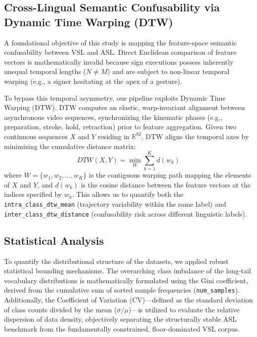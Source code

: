 \documentclass{ieeeaccess}
\begin{document}
\subsection{Cross-Lingual Semantic Confusability via Dynamic Time Warping (DTW)} 
A foundational objective of this study is mapping the feature-space semantic confusability between VSL and ASL. Direct Euclidean comparison of feature vectors is mathematically invalid because sign executions possess inherently unequal temporal lengths ($N \neq M$) and are subject to non-linear temporal warping (e.g., a signer hesitating at the apex of a gesture). 

To bypass this temporal asymmetry, our pipeline exploits Dynamic Time Warping (DTW). DTW computes an elastic, warp-invariant alignment between asynchronous video sequences, synchronizing the kinematic phases (e.g., preparation, stroke, hold, retraction) prior to feature aggregation. Given two continuous sequences $X$ and $Y$ residing in $\mathbb{R}^{82}$, DTW aligns the temporal axes by minimizing the cumulative distance matrix:
\begin{equation} \label{eq:dtw} 
DTW(X, Y) = \min_{W} \sum_{k=1}^{K} d(w_{k}) 
\end{equation}
where $W = \{w_1, w_2, \dots, w_K\}$ is the contiguous warping path mapping the elements of $X$ and $Y$, and $d(w_{k})$ is the cosine distance between the feature vectors at the indices specified by $w_k$. This allows us to quantify both the \texttt{intra\_class\_dtw\_mean} (trajectory variability within the same label) and \texttt{inter\_class\_dtw\_distance} (confusability risk across different linguistic labels).

\subsection{Statistical Analysis}
To quantify the distributional structure of the datasets, we applied robust statistical bounding mechanisms. The overarching class imbalance of the long-tail vocabulary distributions is mathematically formulated using the Gini coefficient, derived from the cumulative sum of sorted sample frequencies (\texttt{num\_samples}). Additionally, the Coefficient of Variation (CV)—defined as the standard deviation of class counts divided by the mean ($\sigma / \mu$)—is utilized to evaluate the relative dispersion of data density, objectively separating the structurally stable ASL benchmark from the fundamentally constrained, floor-dominated VSL corpus.
\end{document}
